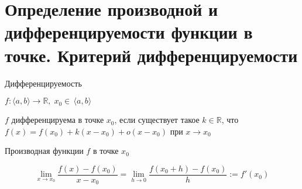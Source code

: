 \section{Определение производной и дифференцируемости функции в точке. Критерий дифференцируемости \href{https://youtu.be/OXDjegAsmSU?t=127}{\Walley}}
\begin{conj}
    Дифференцируемость

    $f: \langle a, b \rangle \to \mathbb{R}, \; x_0 \in \, \langle a, b \rangle$

    $f$ дифференцируема в точке $x_0$, если существует такое $k \in \mathbb{R}$, 
    что $f(x) = f(x_0) + k(x - x_0) + o(x - x_0)$ при $x \to x_0$
\end{conj}

\begin{conj}
    Производная функции $f$ в точке $x_0$

    \[ \lim_{x \to x_0} \frac{f(x) - f(x_0)}{x - x_0} = \lim_{h \to 0} \frac{f(x_0 + h) - f(x_0)}{h}
    := f'(x_0) \]
\end{conj}

